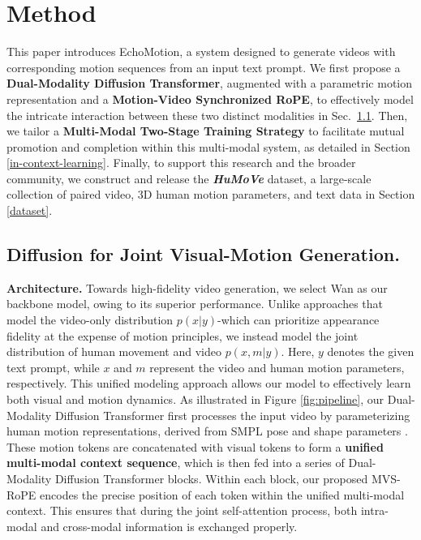 \section{Method}
This paper introduces EchoMotion, a system designed to generate videos with corresponding motion sequences from an input text prompt. 
We first propose a \textbf{Dual-Modality Diffusion Transformer}, augmented with a parametric motion representation and a \textbf{Motion-Video Synchronized RoPE}, to effectively model the intricate interaction between these two distinct modalities in Sec.~\ref{model_design}. Then, we tailor a \textbf{Multi-Modal Two-Stage Training Strategy} to facilitate mutual promotion and completion within this multi-modal system, as detailed in Section \ref{in-context-learning}. Finally, to support this research and the broader community, we construct and release the 
\textbf{\textit{HuMoVe}} dataset, a large-scale collection of paired video, 3D human motion parameters, and text data in Section \ref{dataset}.



\subsection{Diffusion for Joint Visual-Motion Generation.}\label{model_design}
\textbf{Architecture.} Towards high-fidelity video generation, we select Wan \citep{wan2025wan} as our backbone model, owing to its superior performance. Unlike approaches that model the video-only distribution $p(x|y)$-which can prioritize appearance fidelity at the expense of motion principles, we instead model the joint distribution of human movement and video $p(x,m|y)$. Here, $y$ denotes the given text prompt, while $x$ and $m$ represent the video and human motion parameters, respectively. This unified modeling approach allows our model to effectively learn both visual and motion dynamics. 
As illustrated in Figure \ref{fig:pipeline}, our Dual-Modality Diffusion Transformer first processes the input video by parameterizing human motion representations, derived from SMPL pose and shape parameters \citep{loper2023smpl}. These motion tokens are concatenated with visual tokens to form a \textbf{unified multi-modal context sequence}, which is then fed into a series of Dual-Modality Diffusion Transformer blocks. Within each block, our proposed MVS-RoPE encodes the precise position of each token within the unified multi-modal context. This ensures that during the joint self-attention process, both intra-modal and cross-modal information is exchanged properly.




